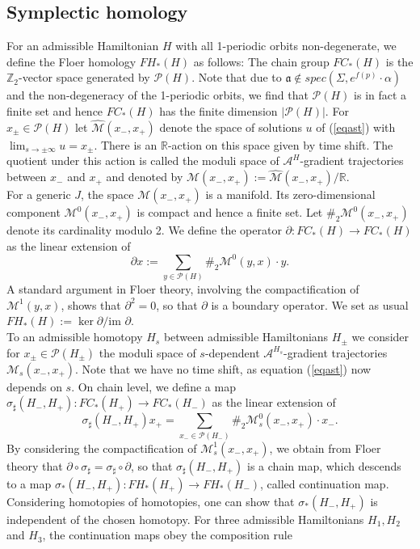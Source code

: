 \documentclass[a4paper,12pt,bibliography=totocnumbered,titlepage=false,abstracton,bookmarksnumbered=true]{scrartcl}
\theoremstyle{definition}
\begin{document}
\subsection{Symplectic homology}\label{secsymhom}
For an admissible Hamiltonian $H$ with all 1-periodic orbits non-degenerate, we define the Floer homology $FH_\ast(H)$ as follows: The chain group $FC_\ast(H)$ is the $\mathbb{Z}_2$-vector space generated by $\mathcal{P}(H)$. Note that due to $\mathfrak{a}\not\in spec(\Sigma,e^{f(p)}\cdot\alpha)$ and the non-degeneracy of the 1-periodic orbits, we find that $\mathcal{P}(H)$ is in fact a finite set and hence $FC_\ast(H)$ has the finite dimension $|\mathcal{P}(H)|$. For $x_\pm\in\mathcal{P}(H)$ let $\widehat{\mathcal{M}}(x_-,x_+)$ denote the space of solutions $u$ of (\ref{eqast}) with $\displaystyle\lim_{s\rightarrow\pm\infty} u = x_\pm$. There is an $\mathbb{R}$-action on this space given by time shift. The quotient under this action is called the moduli space of $\mathcal{A}^H$-gradient trajectories between $x_-$ and $x_+$ and denoted by $\mathcal{M}(x_-,x_+):=\widehat{\mathcal{M}}(x_-,x_+)/\mathbb{R}$.\\
For a generic $J$, the space $\mathcal{M}(x_-,x_+)$ is a manifold. Its zero-dimensional component $\mathcal{M}^0(x_-,x_+)$ is compact and hence a finite set. Let $\#_2\mathcal{M}^0(x_-,x_+)$ denote its cardinality modulo 2. We define the operator $\partial: FC_\ast(H)\rightarrow FC_\ast(H)$ as the linear extension of
\[\partial x:=\sum_{y\in\mathcal{P}(H)}\#_2\mathcal{M}^0(y,x)\cdot y.\]
A standard argument in Floer theory, involving the compactification of $\mathcal{M}^1(y,x)$, shows that $\partial^2=0$, so that $\partial$ is a boundary operator. We set as usual $FH_\ast(H):=\ker \partial\big/\text{im }\partial$.\\
To an admissible homotopy $H_s$ between admissible Hamiltonians $H_\pm$ we consider for $x_\pm\in\mathcal{P}(H_\pm)$ the moduli space of $s$-dependent $\mathcal{A}^{H_s}$-gradient trajectories $\mathcal{M}_s(x_-,x_+)$. Note that we have no time shift, as equation (\ref{eqast}) now depends on $s$. On chain level, we define a map $\sigma_\sharp(H_-,H_+):FC_\ast(H_+)\rightarrow FC_\ast(H_-)$ as the linear extension of 
\[\sigma_\sharp(H_-,H_+)x_+=\sum_{x_-\in\mathcal{P}(H_-)}\#_2\mathcal{M}^0_s(x_-,x_+)\cdot x_-.\]
By considering the compactification of $\mathcal{M}^1_s(x_-,x_+)$, we obtain from Floer theory that $\partial\circ \sigma_\sharp =\sigma_\sharp\circ \partial$, so that $\sigma_\sharp(H_-,H_+)$ is a chain map, which descends to a map  $\sigma_\ast(H_-,H_+):FH_\ast(H_+)\rightarrow FH_\ast(H_-)$, called continuation map. Considering homotopies of homotopies, one can show that $\sigma_\ast(H_-,H_+)$ is independent of the chosen homotopy. For three admissible Hamiltonians $H_1, H_2$ and $H_3$, the continuation maps obey the composition rule
\end{document}
